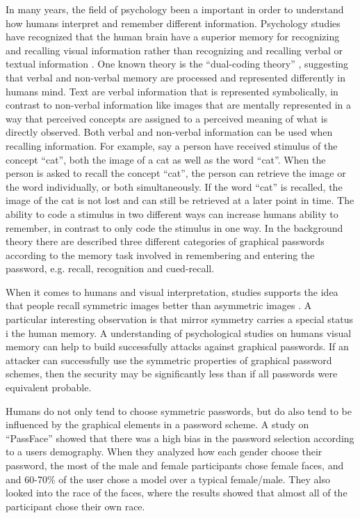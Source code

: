   In many years, the field of psychology been a important in order to understand how humans interpret and remember different information. Psychology studies have recognized that the human brain have a superior memory for recognizing and recalling visual information rather than recognizing and recalling verbal or textual information \cite{DeAngeli}. One known theory is the ``dual-coding theory'' \cite{Biddle}, suggesting that verbal and non-verbal memory are processed and represented differently in humans mind. Text are verbal information that is represented symbolically, in contrast to non-verbal information like images that are mentally represented in a way that perceived concepts are assigned to a perceived meaning of what is directly observed. Both verbal and non-verbal information can be used when recalling information. For example, say a person have received stimulus of the concept ``cat'', both the image of a cat as well as the word ``cat''. When the person is asked to recall the concept ``cat'', the person can retrieve the image or the word individually, or both simultaneously. If the word ``cat'' is recalled, the image of the cat is not lost and can still be retrieved at a later point in time. The ability to code a stimulus in two different ways can increase humans ability to remember, in contrast to only code the stimulus in one way. In the background theory there are described three different categories of graphical passwords according to the memory task involved in remembering and entering the password, e.g. recall, recognition and cued-recall. 

  When it comes to humans and visual interpretation, studies supports the idea that people recall symmetric images better than asymmetric images \cite{Attneave, French}. A particular interesting observation is that mirror symmetry carries a special status i the human memory\cite{Wagemans}. A understanding of psychological studies on humans visual memory can help to build successfully attacks against graphical passwords. If an attacker can successfully use the symmetric properties of graphical password schemes, then the security may be significantly less than if all passwords were equivalent probable. 

  Humans do not only tend to choose symmetric passwords, but do also tend to be influenced by the graphical elements in a password scheme. A study on ``PassFace'' \cite{Davis} showed that there was a high bias in the password selection according to a users demography. When they analyzed how each gender choose their password, the most of the male and female participants chose female faces, and and 60-70\% of the user chose a model over a typical female/male. They also looked into the race of the faces, where the results showed that almost all of the participant chose their own race. 

